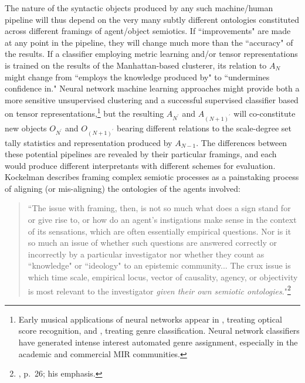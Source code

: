 The nature of the syntactic objects produced by any such machine/human pipeline will thus depend on the very many subtly different ontologies constituted across different framings of agent/object semiotics.  If ``improvements" are made at any point in the pipeline, they will change much more than the ``accuracy" of the results.  If a classifier employing metric learning and/or tensor representations is trained on the results of the Manhattan-based clusterer, its relation to $A_N$ might change from ``employs the knowledge produced by"  to ``undermines confidence in."  Neural network machine learning approaches might provide both a more sensitive unsupervised clustering and a successful supervised classifier based on tensor representations,\footnote{Early musical applications of neural networks appear in \cite{miyao1995}, treating optical score recognition, and \cite{matityaho1995}, treating genre classification.  Neural network classifiers have generated intense interest automated genre assignment, especially in the academic and commercial MIR communities.} but the resulting $A_{N^{\prime}}$ and $A_{(N+1)^{\prime}}$ will co-constitute new objects $O_{N^{\prime}}$ and $O_{(N+1)^{\prime}}$ bearing different relations to the scale-degree set tally statistics and representation produced by $A_{N-1}$.  The differences between these potential pipelines are revealed by their particular framings, and each would produce different interpretants with different schemes for evaluation.  Kockelman describes framing complex semiotic processes as a painstaking process of aligning (or mis-aligning) the ontologies of the agents involved:
\begin{quote}
``The issue with framing, then, is not so much what does a sign stand for or give rise to, or how do an agent's instigations make sense in the context of its sensations, which are often essentially empirical questions.  Nor is it so much an issue of whether such questions are answered correctly or incorrectly by a particular investigator nor whether they count as ``knowledge" or ``ideology" to an epistemic community... The crux issue is which time scale, empirical locus, vector of causality, agency, or objectivity is most relevant to the investigator \emph{given their own semiotic ontologies}."\footnote{\cite{kockelman2013}, p.\ 26; his emphasis.}
\end{quote}
